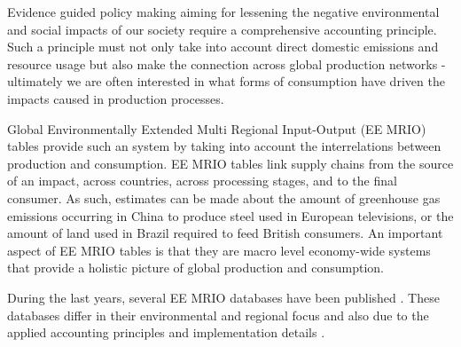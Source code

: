 Evidence guided policy making aiming for lessening the negative environmental and social impacts of our society require a comprehensive accounting principle. Such a principle must not only take into account direct domestic emissions and resource usage but also make the connection across global production networks - ultimately we are often interested in what forms of consumption have driven the impacts caused in production processes.

Global Environmentally Extended Multi Regional Input-Output (EE MRIO) tables provide such an system by taking into account the interrelations between production and consumption. EE MRIO tables link supply chains from the source of an impact, across countries, across processing stages, and to the final consumer. As such, estimates can be made about the amount of greenhouse gas emissions occurring in China to produce steel used in European televisions, or the amount of land used in Brazil required to feed British consumers. An important aspect of EE MRIO tables is that they are macro level economy-wide systems that provide a holistic picture of global production and consumption.    

During the last years, several EE MRIO databases have been published \cite{Tukker_2013}. These databases differ in their environmental and regional focus and also due to the applied accounting principles and implementation details \cite{Stadler_2014, Owen_2014, Moran_2014}. 
